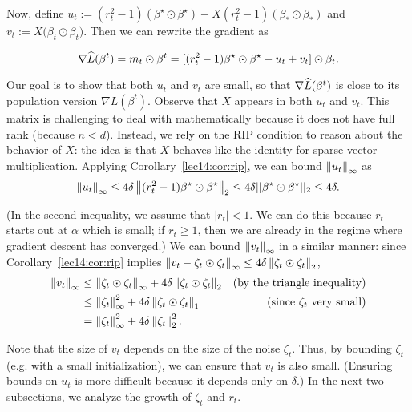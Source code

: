 Now, define $u_{t} := (r_{t}^{2} - 1) (\beta^\star \odot \beta^\star) - X (r_{t}^{2} - 1) (\beta_{*} \odot \beta_{*})$ and $v_{t} := X \big(\beta_{t} \odot \beta_{t}\big)$. Then we can rewrite the gradient as

\begin{equation}
    \nabla \widehat{L}(\beta^t) = m_{t} \odot \beta^{t} = [(r_{t}^{2} -1) \beta^\star \odot \beta^\star - u_{t} + v_{t}] \odot \beta_{t}. \label{lec14:eqn:emp-gradient}
\end{equation}

Our goal is to show that both $u_t$ and $v_t$ are small, so that $\nabla \widehat{L}(\beta^t)$ is close to its population version $\nabla L(\beta^t)$. Observe that $X$ appears in both $u_{t}$ and $v_{t}$. This matrix is challenging to deal with mathematically because it does not have full rank (because $n < d$). Instead, we rely on the RIP condition to reason about the behavior of $X$: the idea is that $X$ behaves like the identity for sparse vector multiplication. Applying Corollary~\ref{lec14:cor:rip}, we can bound $\left\|u_{t}\right\|_{\infty}$ as
\begin{equation} \label{lec14:eqn:u-inf-norm}
    \left\|u_{t}\right\|_{\infty} \leq 4\delta \left\|(r_t^2 - 1)  \beta^\star \odot \beta^\star \right\|_{2} 
    \leq 4\delta ||\beta^\star \odot \beta^\star||_{2} \leq 4\delta.
\end{equation}

(In the second inequality, we assume that $|r_t| < 1$. We can do this because $r_t$ starts out at $\alpha$ which is small; if $r_t \geq 1$, then we are already in the regime where gradient descent has converged.) We can bound $\left\|v_{t}\right\|_{\infty}$ in a similar manner: since Corollary~\ref{lec14:cor:rip} implies $\left\|v_t - \zeta_t \odot \zeta_t\right\|_\infty \leq 4\delta \left\|\zeta_{t} \odot \zeta_{t}\right\|_{2}$,
\begin{align}
    \left\|v_{t}\right\|_{\infty} &\leq \left\|\zeta_{t} \odot \zeta_{t}\right\|_{\infty} + 4\delta \left\|\zeta_{t} \odot \zeta_{t}\right\|_{2} &(\text{by the triangle inequality}) \\
    &\leq \left\|\zeta_{t}\right\|_{\infty}^{2} + 4\delta \left\|\zeta_{t} \odot \zeta_{t}\right\|_{1} &(\text{since } \zeta_t \text{ very small}) \\
    &= \left\|\zeta_{t}\right\|_{\infty}^{2} + 4\delta \left\|\zeta_{t}\right\|_{2}^{2}. \label{lec14:eqn:v-inf-norm}
\end{align}

Note that the size of $v_t$ depends on the size of the noise $\zeta_t$. Thus, by bounding $\zeta_t$ (e.g. with a small initialization), we can ensure that $v_t$ is also small. (Ensuring bounds on $u_t$ is more difficult because it depends only on $\delta$.) In the next two subsections, we analyze the growth of $\zeta_t$ and $r_t$.

